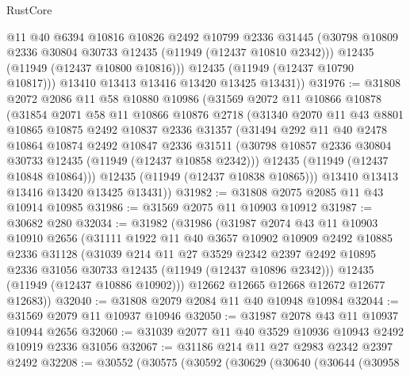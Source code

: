 \begin{lexlean}{RustCore}
\begin{coremodule}
            @11
            @40
            @6394
            @10816
            @10826
            @2492
            @10799
            @2336
            @31445
            (@30798 @10809 @2336 @30804 @30733 @12435 (@11949 (@12437 @10810 @2342)))
            @12435
            (@11949 (@12437 @10800 @10816)))
          @12435
          (@11949 (@12437 @10790 @10817)))
        @13410
        @13413
        @13416
        @13420
        @13425
        @13431))
@31976 := @31808
    @2072
    @2086
    @11
    @58
    @10880
    @10986
    (@31569
      @2072
      @11
      @10866
      @10878
      (@31854
        @2071
        @58
        @11
        @10866
        @10876
        @2718
        (@31340
          @2070
          @11
          @43
          @8801
          @10865
          @10875
          @2492
          @10837
          @2336
          @31357
          (@31494
            @292
            @11
            @40
            @2478
            @10864
            @10874
            @2492
            @10847
            @2336
            @31511
            (@30798 @10857 @2336 @30804 @30733 @12435 (@11949 (@12437 @10858 @2342)))
            @12435
            (@11949 (@12437 @10848 @10864)))
          @12435
          (@11949 (@12437 @10838 @10865)))
        @13410
        @13413
        @13416
        @13420
        @13425
        @13431))
@31982 := @31808 @2075 @2085 @11 @43 @10914 @10985
@31986 := @31569 @2075 @11 @10903 @10912
@31987 := @30682 @280
@32034 := @31982
    (@31986
      (@31987
        @2074
        @43
        @11
        @10903
        @10910
        @2656
        (@31111
          @1922
          @11
          @40
          @3657
          @10902
          @10909
          @2492
          @10885
          @2336
          @31128
          (@31039
            @214
            @11
            @27
            @3529
            @2342
            @2397
            @2492
            @10895
            @2336
            @31056
            @30733
            @12435
            (@11949 (@12437 @10896 @2342)))
          @12435
          (@11949 (@12437 @10886 @10902)))
        @12662
        @12665
        @12668
        @12672
        @12677
        @12683))
@32040 := @31808 @2079 @2084 @11 @40 @10948 @10984
@32044 := @31569 @2079 @11 @10937 @10946
@32050 := @31987 @2078 @43 @11 @10937 @10944 @2656
@32060 := @31039 @2077 @11 @40 @3529 @10936 @10943 @2492 @10919 @2336 @31056
@32067 := @31186 @214 @11 @27 @2983 @2342 @2397 @2492
@32208 := @30552
    (@30575
      (@30592
        (@30629
          (@30640
            (@30644
              (@30958

\end{coremodule}
\end{lexlean}
